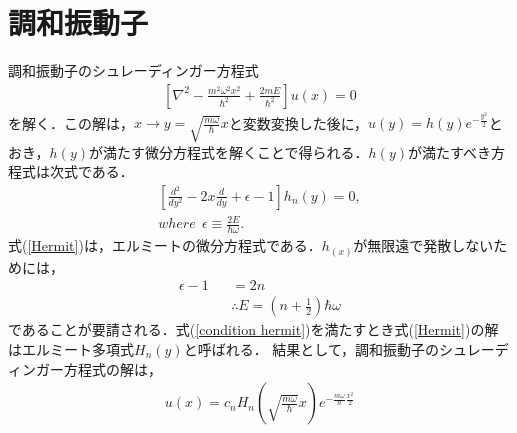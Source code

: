 \documentclass[12pt]{jsarticle}
\numberwithin{equation}{section}
\begin{document}
\section{調和振動子}
調和振動子のシュレーディンガー方程式
\begin{eqnarray}
	\left[\nabla^2 - \frac{m^2 \omega^2 x^2}{\hbar^2} + \frac{2mE}{\hbar^2}\right]u(x) =  0
\end{eqnarray}
を解く．この解は，$x \to y = \sqrt{\frac{m\omega}{\hbar}}x$と変数変換した後に，$u(y) = h(y) e^{-\frac{y^2}{2}}$とおき，$h(y)$が満たす微分方程式を解くことで得られる．$h(y)$が満たすべき方程式は次式である．
\begin{eqnarray}\label{Hermit}
	\left[\frac{d^2}{d y^2} -2x\frac{d}{d y} + \epsilon-1\right]h_n(y) = 0,\\
	where ~~ \epsilon \equiv \frac{2E}{\hbar\omega}.\nonumber
\end{eqnarray}
式(\ref{Hermit})は，エルミートの微分方程式である．$h_(x)$が無限遠で発散しないためには，
\begin{eqnarray}\label{condition hermit}
	\epsilon-1 &&= 2n \nonumber\\
	&&\therefore E = \left(n+\frac{1}{2}\right)\hbar\omega
\end{eqnarray}
であることが要請される．式(\ref{condition hermit})を満たすとき式(\ref{Hermit})の解はエルミート多項式$H_n(y)$と呼ばれる．
結果として，調和振動子のシュレーディンガー方程式の解は，
\begin{eqnarray}
	u(x) = c_n H_n \left(\sqrt{\frac{m\omega}{\hbar}} x\right) e^{-\frac{m\omega}{\hbar}\frac{x^2}{2}}
\end{eqnarray}
\end{document}
